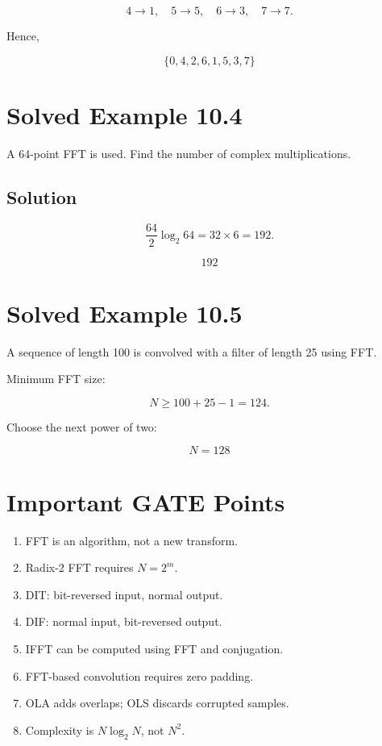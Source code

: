 \[
4\rightarrow1,
\quad
5\rightarrow5,
\quad
6\rightarrow3,
\quad
7\rightarrow7.
\]

Hence,

\[
\boxed{
\{0,4,2,6,1,5,3,7\}
}
\]


\section{Solved Example 10.4}

A 64-point FFT is used. Find the number of complex multiplications.


\subsection{Solution}

\[
\frac{64}{2}\log_2 64
=
32\times6
=
192.
\]

\[
\boxed{
192
}
\]


\section{Solved Example 10.5}

A sequence of length 100 is convolved with a filter of length 25 using FFT.

Minimum FFT size:

\[
N\ge100+25-1=124.
\]

Choose the next power of two:

\[
\boxed{
N=128
}
\]


\section{Important GATE Points}

\begin{enumerate}
\item FFT is an algorithm, not a new transform.
\item Radix-2 FFT requires \(N=2^m\).
\item DIT: bit-reversed input, normal output.
\item DIF: normal input, bit-reversed output.
\item IFFT can be computed using FFT and conjugation.
\item FFT-based convolution requires zero padding.
\item OLA adds overlaps; OLS discards corrupted samples.
\item Complexity is \(N\log_2N\), not \(N^2\).
\end{enumerate}

